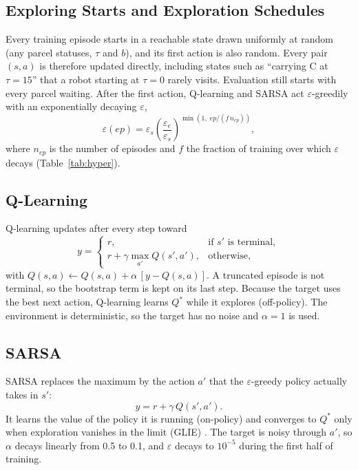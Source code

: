 \documentclass[conference]{IEEEtran}
\newcommand{\Qs}{Q^{*}}
\newcommand{\eps}{\varepsilon}
\begin{document}
\subsection{Exploring Starts and Exploration Schedules}
Every training episode starts in a reachable state drawn uniformly at random (any parcel statuses, $\tau$ and $b$), and its first action is also random. Every pair $(s,a)$ is therefore updated directly, including states such as ``carrying C at $\tau=15$'' that a robot starting at $\tau=0$ rarely visits. Evaluation still starts with every parcel waiting. After the first action, Q-learning and SARSA act $\eps$-greedily with an exponentially decaying $\eps$,
\begin{equation}
\eps(ep)=\eps_{s}\left(\frac{\eps_{e}}{\eps_{s}}\right)^{\min\left(1,\;ep/(f\,n_{ep})\right)},
\end{equation}
where $n_{ep}$ is the number of episodes and $f$ the fraction of training over which $\eps$ decays (Table~\ref{tab:hyper}).

\subsection{Q-Learning}
Q-learning \cite{b2} updates after every step toward
\begin{equation}
y=\begin{cases} r, & \text{if } s' \text{ is terminal},\\ r+\gamma\max_{a'}Q(s',a'), & \text{otherwise},\end{cases}\label{eq:ql}
\end{equation}
with $Q(s,a)\leftarrow Q(s,a)+\alpha\,[y-Q(s,a)]$. A truncated episode is not terminal, so the bootstrap term is kept on its last step. Because the target uses the best next action, Q-learning learns $\Qs$ while it explores (off-policy). The environment is deterministic, so the target has no noise and $\alpha=1$ is used.

\subsection{SARSA}
SARSA \cite{b3} replaces the maximum by the action $a'$ that the $\eps$-greedy policy actually takes in $s'$:
\begin{equation}
y=r+\gamma\,Q(s',a').\label{eq:sarsa}
\end{equation}
It learns the value of the policy it is running (on-policy) and converges to $\Qs$ only when exploration vanishes in the limit (GLIE) \cite{b7}. The target is noisy through $a'$, so $\alpha$ decays linearly from 0.5 to 0.1, and $\eps$ decays to $10^{-5}$ during the first half of training.
\end{document}
